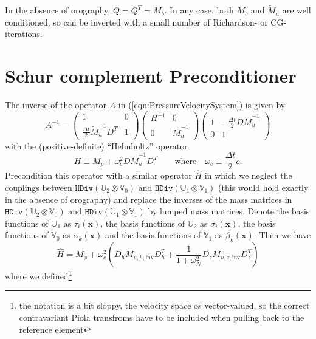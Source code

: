 \documentclass[10pt]{article}
\newcommand{\Uspace}{\mathbb{U}}
\newcommand{\Vspace}{\mathbb{V}}
\newcommand{\Hdiv}{\texttt{HDiv}}
\renewcommand{\vec}[1]{\boldsymbol{#1}}
\begin{document}
In the absence of orography, $Q=Q^T=M_b$. In any case, both $M_b$ and $\tilde{M}_u$ are well conditioned, so can be inverted with a small number of Richardson- or CG- iterations.
\section{Schur complement Preconditioner}
The inverse of the operator $A$ in (\ref{eqn:PressureVelocitySystem}) is given by
\begin{equation}
  A^{-1} = 
\begin{pmatrix}
  1 & 0 \\[1ex]
  \frac{\Delta t}{2}\tilde{M}_u^{-1} D^T & 1
\end{pmatrix}
\begin{pmatrix}
  H^{-1} & 0 \\[1ex] 0 & \tilde{M}_u^{-1}
\end{pmatrix}
\begin{pmatrix}
  1 & -\frac{\Delta t}{2}D\tilde{M}_u^{-1} \\[1ex]
  0 & 1
\end{pmatrix}
\end{equation}
with the (positive-definite) ``Helmholtz'' operator
\begin{equation}
  H \equiv M_p + \omega_c^2 D\tilde{M}_u^{-1} D^T
\qquad\text{where}\quad \omega_c \equiv \frac{\Delta t}{2}c.
\end{equation}
Precondition this operator with a similar operator $\hat{H}$ in which we neglect the couplings between $\Hdiv(\Uspace_2\otimes\Vspace_0)$ and $\Hdiv(\Uspace_1\otimes\Vspace_1)$ (this would hold exactly in the absence of orography) and replace the inverses of the mass matrices in $\Hdiv(\Uspace_2\otimes\Vspace_0)$ and $\Hdiv(\Uspace_1\otimes\Vspace_1)$ by lumped mass matrices. Denote the basis functions of $\Uspace_1$ as $\tau_i(\vec{x})$, the basis functions of $\Uspace_2$ as $\sigma_i(\vec{x})$, the basis functions of $\Vspace_0$ as $\alpha_k(\vec{x})$ and the basis functions of $\Vspace_1$ as $\beta_k(\vec{x})$. Then we have
\begin{equation}
  \hat{H} = M_{\phi} + \omega_c^2\left(
  D_h M_{u,h,\text{inv}} D_h^T +
\frac{1}{1+\omega_N^2}D_z M_{u,z,\text{inv}} D_z^T\right)
\label{eqn:Preconditioner}
\end{equation}
where we defined\footnote{the notation is a bit sloppy, the velocity space os vector-valued, so the correct contravariant Piola transfroms have to be included when pulling back to the reference element}
\end{document}
